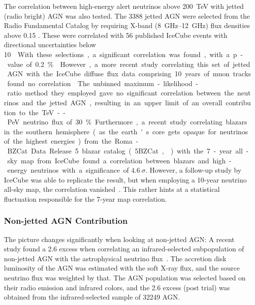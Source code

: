 The correlation between high-energy alert neutrinos above \SI{200}{\tera\eV} with jetted (radio bright) AGN was also tested. The 3388 jetted AGN were selected from the Radio Fundamental Catalog by requiring X-band (\SIrange{8}{12}{\giga\Hz}) flux densities above 0.15 \unit{\jansky}. These were correlated with 56 published IceCube events with directional uncertainties below \SI{10}{\square\deg}. With these selections, a significant correlation was found, with a p-value of \SI{0.2}{\percent}~.

However, a more recent study correlating this set of jetted AGN with the IceCube diffuse flux data comprising 10 years of muon tracks found no correlation~. The unbinned maximum-likelihood-ratio method they employed gave no significant correlation between the neutrinos and the jetted AGN, resulting in an upper limit of an overall contribution to the \unit{\tera\eV}--\unit{\peta\eV} neutrino flux of \SI{30}{\percent}.

Furthermore, a recent study correlating blazars in the southern hemisphere (as the earth's core gets opaque for neutrinos of the highest energies) from the Roma-BZCat Data Release 5 blazar catalog (5BZCat,~) with the 7-year all-sky map from IceCube found a correlation between blazars and high-energy neutrinos with a significance of $4.6~\sigma$. However, a follow-up study by IceCube was able to replicate the result, but when employing a 10-year neutrino all-sky map, the correlation vanished~. This rather hints at a statistical fluctuation responsible for the 7-year map correlation.

\subsubsection{Non-jetted AGN Contribution}

The picture changes significantly when looking at non-jetted AGN: A recent study found a \SI{2.6}{\sigma} excess when correlating an infrared-selected subpopulation of non-jetted AGN with the astrophysical neutrino flux~. The accretion disk luminosity of the AGN was estimated with the soft X-ray flux, and the source neutrino flux was weighted by that. The AGN population was selected based on their radio emission and infrared colors, and the \SI{2.6}{\sigma} excess (post trial) was obtained from the infrared-selected sample of 32249 AGN.

